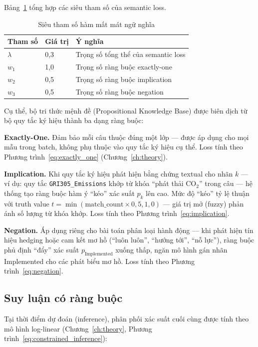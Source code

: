 Bảng~\ref{tab:semantic_loss_params} tổng hợp các siêu tham số của semantic loss.

\begin{table}[htbp]
\centering
\caption{Siêu tham số hàm mất mát ngữ nghĩa}
\label{tab:semantic_loss_params}
\small
\renewcommand{\arraystretch}{1.2}
\begin{tabular}{|l|l|p{6.5cm}|}
\hline
\textbf{Tham số} & \textbf{Giá trị} & \textbf{Ý nghĩa} \\
\hline
$\lambda$ & 0{,}3 & Trọng số tổng thể của semantic loss \\
\hline
$w_1$ & 1{,}0 & Trọng số ràng buộc exactly-one \\
\hline
$w_2$ & 0{,}5 & Trọng số ràng buộc implication \\
\hline
$w_3$ & 0{,}5 & Trọng số ràng buộc negation \\
\hline
\end{tabular}
\end{table}

Cụ thể, bộ tri thức mệnh đề (Propositional Knowledge Base) được biên dịch từ bộ quy tắc ký hiệu thành ba dạng ràng buộc:

\textbf{Exactly-One.} Đảm bảo mỗi câu thuộc đúng một lớp --- được áp dụng cho mọi mẫu trong batch, không phụ thuộc vào quy tắc ký hiệu cụ thể. Loss tính theo Phương trình~\ref{eq:exactly_one} (Chương~\ref{ch:theory}).

\textbf{Implication.} Khi quy tắc ký hiệu phát hiện bằng chứng textual cho nhãn $k$ --- ví dụ: quy tắc \texttt{GRI305\_Emissions} khớp từ khóa ``phát thải CO$_2$'' trong câu --- hệ thống tạo ràng buộc hàm ý ``kéo'' xác suất $p_k$ lên cao. Mức độ ``kéo'' tỷ lệ thuận với truth value $t = \min(\text{match\_count} \times 0{,}5, 1{,}0)$ --- giá trị mở (fuzzy) phản ánh số lượng từ khóa khớp. Loss tính theo Phương trình~\ref{eq:implication}.

\textbf{Negation.} Áp dụng riêng cho bài toán phân loại hành động --- khi phát hiện tín hiệu hedging hoặc cam kết mơ hồ (``luôn luôn'', ``hướng tới'', ``nỗ lực''), ràng buộc phủ định ``đẩy'' xác suất $p_{\text{Implemented}}$ xuống thấp, ngăn mô hình gán nhãn Implemented cho các phát biểu mơ hồ. Loss tính theo Phương trình~\ref{eq:negation}.


\subsection{Suy luận có ràng buộc}
\label{subsec:training_inference}

Tại thời điểm dự đoán (inference), phân phối xác suất cuối cùng được tính theo mô hình log-linear (Chương~\ref{ch:theory}, Phương trình~\ref{eq:constrained_inference}):

